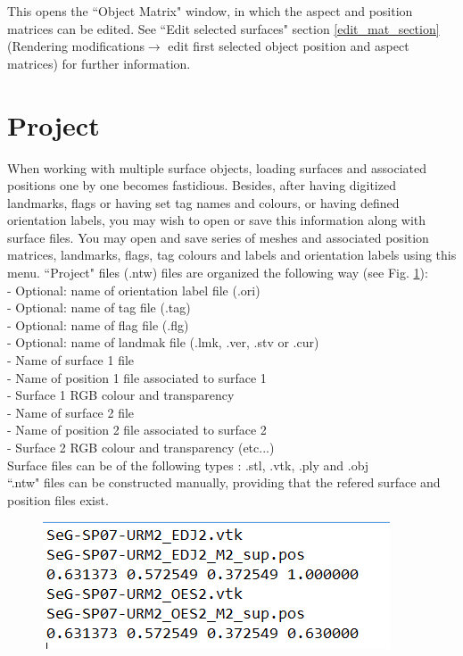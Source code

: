 This opens the ``Object Matrix" window, in which the aspect and position matrices can be edited. See ``Edit selected surfaces" section \ref{edit_mat_section} (Rendering modifications$\rightarrow$ edit first selected object position and aspect matrices) for further information.


\section{Project}
When working with multiple surface objects, 
loading surfaces and associated positions one
by one becomes fastidious. Besides, after having digitized landmarks, flags or having set tag names and colours, or having defined orientation labels, you may wish to open or save this information along with surface files. You may open and
save series of meshes and associated position matrices, landmarks, flags, tag colours and labels and orientation labels using this menu. ``Project" files (.ntw) files are organized the
following way (see Fig. \ref{project_file}):\\
- Optional: name of orientation label file (.ori)\\
- Optional: name of tag file (.tag)\\
- Optional: name of flag file (.flg)\\
- Optional: name of landmak file (.lmk, .ver, .stv or .cur)\\
- Name of surface 1 file\\
- Name of position 1 file associated to surface 1\\
- Surface 1 RGB colour and transparency\\
- Name of surface 2 file\\
- Name of position 2 file associated to surface 2\\
- Surface 2 RGB colour and transparency (etc...)\\
 
Surface files can be of the following types : .stl, .vtk, .ply and .obj\\
``.ntw" files can be constructed manually, providing that the refered surface and position files exist.



\begin{figure}
  \centering  
 \includegraphics[scale=0.5]{images/File/Ntw.png}
\label{project_file}
\end{figure}

